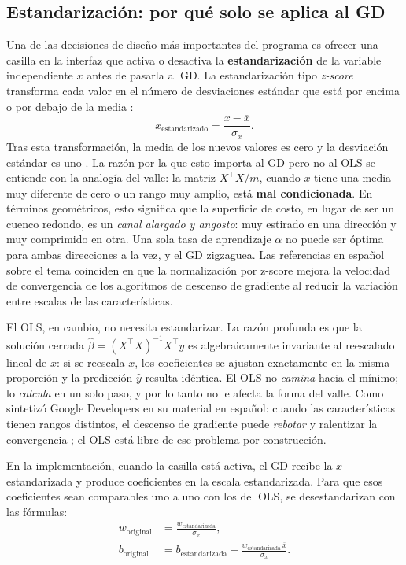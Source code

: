 \documentclass[11pt,a4paper]{article}
\begin{document}
\subsection{Estandarización: por qué solo se aplica al GD}

Una de las decisiones de diseño más importantes del programa es ofrecer una casilla en la interfaz que activa o desactiva la \textbf{estandarización} de la variable independiente $x$ antes de pasarla al GD. La estandarización tipo \textit{z-score} transforma cada valor en el número de desviaciones estándar que está por encima o por debajo de la media \cite{wiki_tipificada,duque_zscore}:
\begin{equation}
x_{\text{estandarizado}} = \frac{x - \overline{x}}{\sigma_x}.
\end{equation}
Tras esta transformación, la media de los nuevos valores es cero y la desviación estándar es uno \cite{duque_zscore,statseasily_zscore}. La razón por la que esto importa al GD pero no al OLS se entiende con la analogía del valle: la matriz $X^{\top}X/m$, cuando $x$ tiene una media muy diferente de cero o un rango muy amplio, está \textbf{mal condicionada}. En términos geométricos, esto significa que la superficie de costo, en lugar de ser un cuenco redondo, es un \textit{canal alargado y angosto}: muy estirado en una dirección y muy comprimido en otra. Una sola tasa de aprendizaje $\alpha$ no puede ser óptima para ambas direcciones a la vez, y el GD zigzaguea. Las referencias en español sobre el tema \cite{datacamp_norm,eitca_scaling,google_norm} coinciden en que la normalización por z-score mejora la velocidad de convergencia de los algoritmos de descenso de gradiente al reducir la variación entre escalas de las características.

El OLS, en cambio, no necesita estandarizar. La razón profunda es que la solución cerrada $\hat{\beta} = (X^{\top}X)^{-1} X^{\top} y$ es algebraicamente invariante al reescalado lineal de $x$: si se reescala $x$, los coeficientes se ajustan exactamente en la misma proporción y la predicción $\hat{y}$ resulta idéntica. El OLS no \textit{camina} hacia el mínimo; lo \textit{calcula} en un solo paso, y por lo tanto no le afecta la forma del valle. Como sintetizó Google Developers en su material en español: cuando las características tienen rangos distintos, el descenso de gradiente puede \textit{rebotar} y ralentizar la convergencia \cite{google_norm}; el OLS está libre de ese problema por construcción.

En la implementación, cuando la casilla está activa, el GD recibe la $x$ estandarizada y produce coeficientes en la escala estandarizada. Para que esos coeficientes sean comparables uno a uno con los del OLS, se desestandarizan con las fórmulas:
\begin{align}
w_{\text{original}} &= \frac{w_{\text{estandarizada}}}{\sigma_x}, \\
b_{\text{original}} &= b_{\text{estandarizada}} - \frac{w_{\text{estandarizada}}\,\overline{x}}{\sigma_x}.
\end{align}
\end{document}
